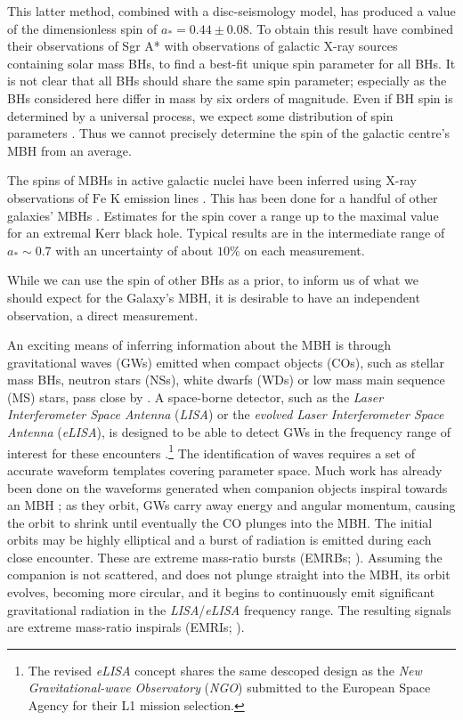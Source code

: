 \documentclass[useAMS,usedcolumn,usegraphicx,usenatbib]{mn2e}
\begin{document}
This latter method, combined with a disc-seismology model, has produced a value of the dimensionless spin of $a_\ast = 0.44 \pm 0.08$. To obtain this result \citet{Kato2010} have combined their observations of Sgr A* with observations of galactic X-ray sources containing solar mass BHs, to find a best-fit unique spin parameter for all BHs. It is not clear that all BHs should share the same spin parameter; especially as the BHs considered here differ in mass by six orders of magnitude. Even if BH spin is determined by a universal process, we expect some distribution of spin parameters \citep*{King2008, Berti2008}. Thus we cannot precisely determine the spin of the galactic centre's MBH from an average.

The spins of MBHs in active galactic nuclei have been inferred using X-ray observations of $\mathrm{Fe}$ $\mathrm{K}$ emission lines \citep{Miller2007, McClintock2011}. This has been done for a handful of other galaxies' MBHs \citep{Brenneman2006, Miniutti2009, Schmoll2009, delaCallePerez2010, Zoghbi2010, Nardini2011,  Patrick2011}. Estimates for the spin cover a range up to the maximal value for an extremal Kerr black hole. Typical results are in the intermediate range of $a_\ast \sim 0.7$ with an uncertainty of about $10\%$ on each measurement.

While we can use the spin of other BHs as a prior, to inform us of what we should expect for the Galaxy's MBH, it is desirable to have an independent observation, a direct measurement.

An exciting means of inferring information about the MBH is through gravitational waves (GWs) emitted when compact objects (COs), such as stellar mass BHs, neutron stars (NSs), white dwarfs (WDs) or low mass main sequence (MS) stars, pass close by \citep{Sathyaprakash2009}. A space-borne detector, such as the \textit{Laser Interferometer Space Antenna} (\textit{LISA}) or the \textit{evolved Laser Interferometer Space Antenna} (\textit{eLISA}), is designed to be able to detect GWs in the frequency range of interest for these encounters \citep{Bender1998, Danzmann2003, Jennrich2011, Amaro-Seoane2012a, Amaro-Seoane2012}.\footnote{The revised \textit{eLISA} concept shares the same descoped design as the \textit{New Gravitational-wave Observatory} (\textit{NGO}) submitted to the European Space Agency for their L1 mission selection.} The identification of waves requires a set of accurate waveform templates covering parameter space. Much work has already been done on the waveforms generated when companion objects inspiral towards an MBH \citep{Glampedakis2005, Barack2009}; as they orbit, GWs carry away energy and angular momentum, causing the orbit to shrink until eventually the CO plunges into the MBH. The initial orbits may be highly elliptical and a burst of radiation is emitted during each close encounter. These are extreme mass-ratio bursts (EMRBs; \citealt*{Rubbo2006}). Assuming the companion is not scattered, and does not plunge straight into the MBH, its orbit evolves, becoming more circular, and it begins to continuously emit significant gravitational radiation in the \textit{LISA}/\textit{eLISA} frequency range. The resulting signals are extreme mass-ratio inspirals (EMRIs; \citealt{Amaro-Seoane2007, Amaro-Seoane2012c}).
\end{document}
